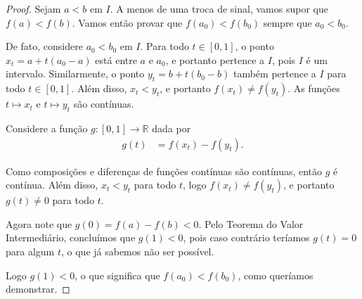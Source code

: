 \begin{proof}
	Sejam $a<b$ em $I$. A menos de uma troca de sinal, vamos supor que $f(a)<f(b)$. Vamos então provar que $f(a_0)<f(b_0)$ sempre que $a_0<b_0$.
	
	De fato, considere $a_0<b_0$ em $I$. Para todo $t\in[0,1]$, o ponto $x_t=a+t(a_0-a)$ está entre $a$ e $a_0$, e portanto pertence a $I$, pois $I$ é um intervalo. Similarmente, o ponto $y_t=b+t(b_0-b)$ também pertence a $I$ para todo $t\in[0,1]$. Além disso, $x_t<y_t$, e portanto $f(x_t)\neq f(y_t)$. As funções $t\mapsto x_t$ e $t\mapsto y_t$ são contínuas.
	
	Considere a função $g\colon [0,1]\to\mathbb{R}$ dada por
	\begin{align*}
		g(t)&=f(x_t)-f(y_t).
	\end{align*}
	
	Como composições e diferenças de funções contínuas são contínuas, então $g$ é contínua. Além disso, $x_t<y_t$ para todo $t$, logo $f(x_t)\neq f(y_t)$, e portanto $g(t)\neq 0$ para todo $t$.
	
	Agora note que $g(0)=f(a)-f(b)<0$. Pelo Teorema do Valor Intermediário, concluímos que $g(1)<0$, pois caso contrário teríamos $g(t)=0$ para algum $t$, o que já sabemos não ser possível.
	
	Logo $g(1)<0$, o que significa que $f(a_0)<f(b_0)$, como queríamos demonstrar.
\end{proof}
